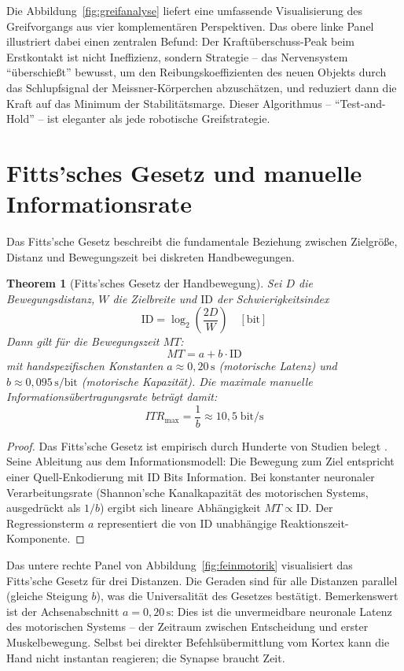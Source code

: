 ﻿\documentclass[12pt,a4paper]{report}
\theoremstyle{plain}
\newtheorem{theorem}{Theorem}[section]
\theoremstyle{definition}
\theoremstyle{remark}
\begin{document}
Die Abbildung~\ref{fig:greifanalyse} liefert eine umfassende Visualisierung
des Greifvorgangs aus vier komplementären Perspektiven. Das obere linke Panel
illustriert dabei einen zentralen Befund: Der Kraftüberschuss-Peak beim
Erstkontakt ist nicht Ineffizienz, sondern Strategie -- das Nervensystem
``überschießt'' bewusst, um den Reibungskoeffizienten des neuen Objekts
durch das Schlupfsignal der Meissner-Körperchen abzuschätzen, und reduziert
dann die Kraft auf das Minimum der Stabilitätsmarge. Dieser Algorithmus
-- ``Test-and-Hold'' -- ist eleganter als jede robotische Greifstrategie.

\section{Fitts'sches Gesetz und manuelle Informationsrate}

Das Fitts'sche Gesetz beschreibt die fundamentale Beziehung zwischen
Zielgröße, Distanz und Bewegungszeit bei diskreten Handbewegungen.

\begin{theorem}[Fitts'sches Gesetz der Handbewegung]
\label{thm:fitts}
Sei $D$ die Bewegungsdistanz, $W$ die Zielbreite und $\mathrm{ID}$ der
Schwierigkeitsindex
\[
  \mathrm{ID} = \log_2\!\left(\frac{2D}{W}\right)\quad [\text{bit}]
\]
Dann gilt für die Bewegungszeit $MT$:
\[
  MT = a + b \cdot \mathrm{ID}
\]
mit handspezifischen Konstanten $a \approx 0{,}20\,\text{s}$ (motorische
Latenz) und $b \approx 0{,}095\,\text{s/bit}$ (motorische Kapazität).
Die maximale manuelle Informationsübertragungsrate beträgt damit:
\[
  ITR_{\max} = \frac{1}{b} \approx 10{,}5\;\text{bit/s}
\]
\end{theorem}

\begin{proof}
Das Fitts'sche Gesetz ist empirisch durch Hunderte von Studien belegt
\cite{fitts1954, mackenzie1992}. Seine Ableitung aus dem Informationsmodell:
Die Bewegung zum Ziel entspricht einer Quell-Enkodierung mit $\mathrm{ID}$
Bits Information. Bei konstanter neuronaler Verarbeitungsrate
(Shannon'sche Kanalkapazität des motorischen Systems, ausgedrückt als $1/b$)
ergibt sich lineare Abhängigkeit $MT \propto \mathrm{ID}$. Der
Regressionsterm $a$ representiert die von $\mathrm{ID}$ unabhängige
Reaktionszeit-Komponente.
\end{proof}

Das untere rechte Panel von Abbildung~\ref{fig:feinmotorik} visualisiert
das Fitts'sche Gesetz für drei Distanzen. Die Geraden sind für alle Distanzen
parallel (gleiche Steigung $b$), was die Universalität des Gesetzes
bestätigt. Bemerkenswert ist der Achsenabschnitt $a = 0{,}20\,\text{s}$:
Dies ist die unvermeidbare neuronale Latenz des motorischen Systems --
der Zeitraum zwischen Entscheidung und erster Muskelbewegung. Selbst
bei direkter Befehlsübermittlung vom Kortex kann die Hand nicht instantan
reagieren; die Synapse braucht Zeit.
\end{document}
